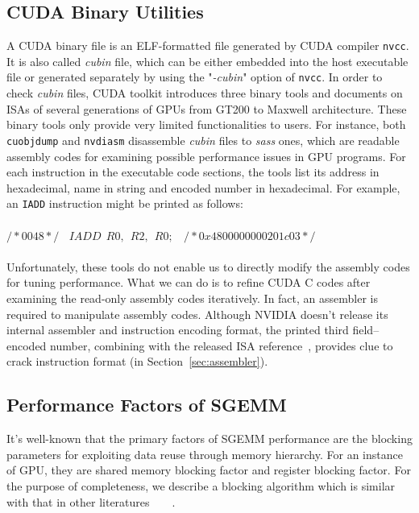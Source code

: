 \documentclass{sig-alternate-05-2015}
\begin{document}
\subsection{CUDA Binary Utilities}
\label{sec:cuda}

A CUDA binary file is an ELF-formatted file generated by CUDA compiler {\tt nvcc}. It is also called {\em cubin} file, which can be either embedded into the host executable file or generated separately by using the "{\em -cubin}" option of {\tt nvcc}. In order to check {\em cubin} files, CUDA toolkit introduces three binary tools and documents on ISAs of several generations of GPUs from GT200 to Maxwell architecture. These binary tools only provide very limited functionalities to users. For instance, both {\tt cuobjdump} and {\tt nvdiasm} disassemble {\em cubin} files to {\em sass} ones, which are readable assembly codes for examining possible performance issues in GPU programs. For each instruction in the executable code sections, the tools list its address in hexadecimal, name in string and encoded number in hexadecimal. For example, an {\tt IADD} instruction might be printed as follows: \\\\
$/*0048*/~~~~IADD~~R0,~~R2,~~R0;~~~~/* 0x4800000000201c03 */$\\\\
Unfortunately, these tools do not enable us to directly modify the assembly codes for tuning performance. What we can do is to refine CUDA C codes after examining the read-only assembly codes iteratively. In fact, an assembler is required to manipulate assembly codes. Although NVIDIA doesn't release its internal assembler and instruction encoding format, the printed third field--encoded number, combining with the released ISA reference~\cite{}, provides clue to crack instruction format (in Section~\ref{sec:assembler}).


\subsection{Performance Factors of SGEMM }
It's well-known that the primary factors of SGEMM performance are the blocking parameters for exploiting data reuse through memory hierarchy. For an instance of GPU, they are shared memory blocking factor and register blocking factor. For the purpose of completeness, we describe a blocking algorithm which is similar with that in other literatures~\cite{magma}~\cite{nervana_sgemm_wiki}~\cite{lai}~\cite{tan}.
\end{document}
